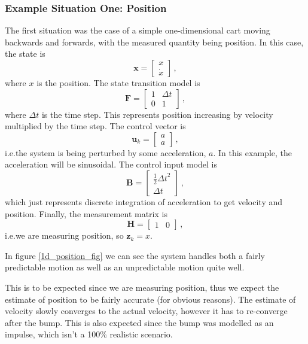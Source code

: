 \documentclass[12pt]{article}
\begin{document}
\subsubsection{Example Situation One: Position}
The first situation was the case of a simple one-dimensional cart moving backwards and forwards, with the measured quantity being position. In this case, the state is
$$\mathbf{x} = \begin{bmatrix} x \\ \dot{x} \end{bmatrix} \,,$$
where $x$ is the position. The state transition model is
$$\mathbf{F} = \begin{bmatrix} 1 & \Delta t \\ 0 & 1 \end{bmatrix} \,,$$
where $\Delta t$ is the time step. This represents position increasing by velocity multiplied by the time step. The control vector is
$$\mathbf{u}_k = \begin{bmatrix} a \\a\end{bmatrix} \,,$$
i.e.\@ the system is being perturbed by some acceleration, $a$. In this example, the acceleration will be sinusoidal. The control input model is 
$$\mathbf{B} = \begin{bmatrix} \frac{1}{2} {\Delta t}^2 \\ \Delta t \end{bmatrix} \,,$$
which just represents discrete integration of acceleration to get velocity and position. Finally, the measurement matrix is
$$\mathbf{H} = \begin{bmatrix} 1 & 0 \end{bmatrix} \,,$$
i.e.\@ we are measuring position, so $\mathbf{z}_k=x$.

In figure \ref{1d_position_fig} we can see the system handles both a fairly predictable motion as well as an unpredictable motion quite well. 

This is to be expected since we are measuring position, thus we expect the estimate of position to be fairly accurate (for obvious reasons). The estimate of velocity slowly converges to the actual velocity, however it has to re-converge after the bump. This is also expected since the bump was modelled as an impulse, which isn't a 100\% realistic scenario.
\end{document}
